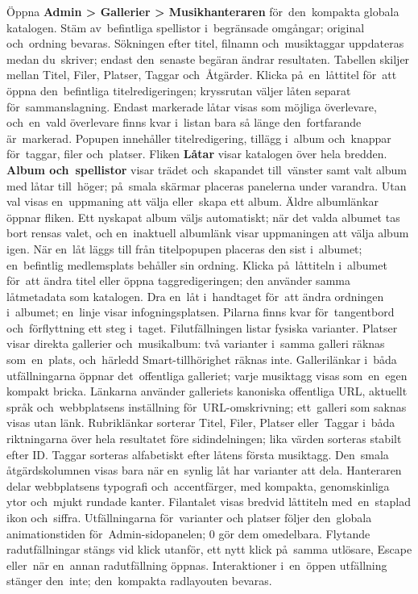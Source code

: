\documentclass[11pt,a4paper]{article}
\newcommand{\ui}[1]{\textbf{#1}}
\begin{document}
Öppna \ui{Admin > Gallerier > Musikhanteraren} för~den~kompakta globala
katalogen. Stäm av~befintliga spellistor i~begränsade omgångar; original
och~ordning bevaras. Sökningen efter titel, filnamn och~musiktaggar uppdateras
medan du~skriver; endast den~senaste begäran ändrar resultaten. Tabellen skiljer
mellan Titel, Filer, Platser, Taggar och~Åtgärder. Klicka på~en~låttitel för~att
öppna den~befintliga titelredigeringen; kryssrutan väljer låten separat
för~sammanslagning. Endast markerade låtar visas som möjliga överlevare,
och~en~vald
överlevare finns kvar i~listan bara så länge den~fortfarande är~markerad.
Popupen
innehåller titelredigering, tillägg i~album och~knappar för~taggar, filer
och~platser.
Fliken \ui{Låtar} visar katalogen över hela bredden.
\ui{Album och~spellistor} visar trädet och~skapandet till~vänster samt valt
album
med låtar till~höger; på~smala skärmar placeras panelerna under varandra. Utan
val
visas en~uppmaning att välja eller~skapa ett album. Äldre albumlänkar öppnar
fliken.
Ett nyskapat album väljs automatiskt; när det valda albumet tas bort rensas
valet,
och en~inaktuell albumlänk visar uppmaningen att välja album igen.
När en~låt läggs till från titelpopupen placeras den sist i~albumet;
en~befintlig
medlemsplats behåller sin ordning. Klicka på~låttiteln i~albumet för~att ändra
titel eller öppna taggredigeringen; den använder samma låtmetadata som katalogen.
Dra en~låt i~handtaget för~att ändra ordningen i~albumet; en~linje visar
infogningsplatsen. Pilarna finns kvar för~tangentbord
och~förflyttning ett steg i~taget.
Filutfällningen listar fysiska varianter. Platser visar
direkta gallerier och~musikalbum: två varianter i~samma galleri räknas
som~en~plats, och~härledd Smart-tillhörighet räknas inte. Gallerilänkar i~båda
utfällningarna
öppnar det~offentliga galleriet; varje musiktagg visas som~en~egen kompakt
bricka. Länkarna använder galleriets kanoniska offentliga URL, aktuellt språk
och~webbplatsens inställning för~URL-omskrivning; ett~galleri som saknas visas
utan länk. Rubriklänkar sorterar Titel, Filer, Platser eller~Taggar i~båda
riktningarna över hela resultatet före sidindelningen; lika värden sorteras
stabilt efter ID. Taggar sorteras alfabetiskt efter låtens första musiktagg.
Den~smala åtgärdskolumnen visas bara när en~synlig låt har varianter att dela.
Hanteraren delar webbplatsens typografi och~accentfärger, med kompakta,
genomskinliga ytor och~mjukt rundade kanter. Filantalet visas bredvid
låttiteln med~en~staplad ikon och~siffra. Utfällningarna för~varianter och
platser följer den~globala animationstiden för~Admin-sidopanelen; 0 gör dem
omedelbara.
Flytande radutfällningar stängs vid klick utanför, ett nytt klick på~samma
utlösare, Escape eller~när en~annan radutfällning öppnas. Interaktioner
i~en~öppen
utfällning stänger den~inte; den~kompakta radlayouten bevaras.
\end{document}
